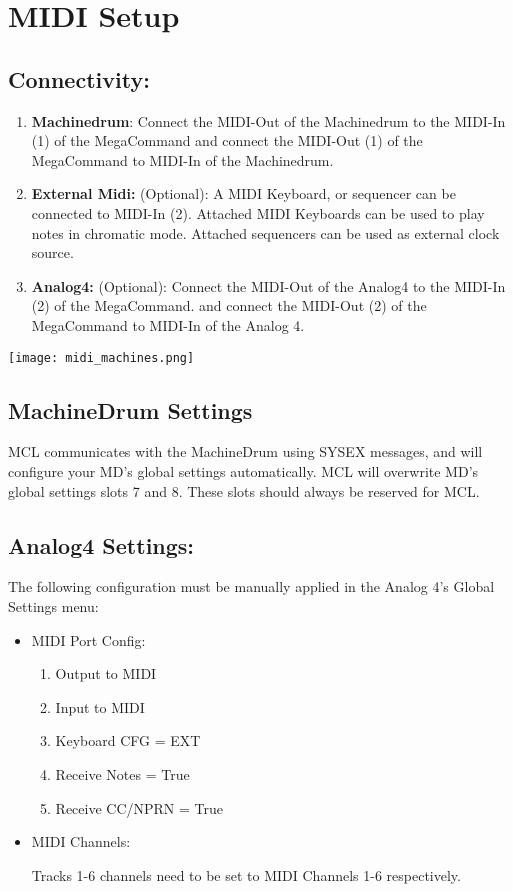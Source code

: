\chapter{MIDI Setup}
\section{Connectivity:}

\begin{enumerate}
\item\textbf{Machinedrum}:
Connect the MIDI-Out of the Machinedrum to the MIDI-In (1) of the MegaCommand and connect the MIDI-Out (1) of the MegaCommand to MIDI-In of the Machinedrum.

\item\textbf{External Midi:} (Optional): 
A MIDI Keyboard, or sequencer can be connected to MIDI-In (2). Attached MIDI Keyboards can be used to play notes in chromatic mode. Attached sequencers can be used as external clock source.

\item\textbf{Analog4:} (Optional):
Connect the MIDI-Out of the Analog4 to the MIDI-In (2) of the MegaCommand. and connect the MIDI-Out (2) of the MegaCommand to MIDI-In of the Analog 4.
\end{enumerate}
\texttt{[image: midi\_machines.png]}
\\
\section{MachineDrum Settings }

MCL communicates with the MachineDrum using SYSEX messages, and will configure your MD's global settings automatically. MCL will overwrite MD's global settings slots 7 and 8. These slots should always be reserved for MCL.

\section{Analog4 Settings:}

The following configuration must be manually applied in the Analog 4's Global Settings menu:

\begin{itemize}

\item{MIDI Port Config:}
\begin{enumerate}
\item{Output to MIDI}
\item{Input to MIDI}
\item{Keyboard CFG = EXT}
\item{Receive Notes = True}
\item{Receive CC/NPRN = True}
\end{enumerate}
\item{MIDI Channels:}

Tracks 1-6 channels need to be set to MIDI Channels 1-6 respectively.

\end{itemize}

